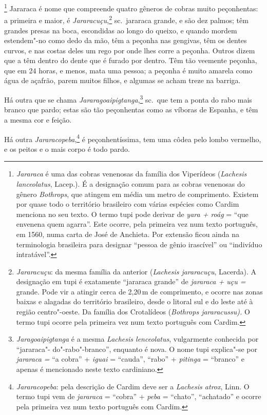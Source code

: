 \footnote{ \textit{Jararaca} é uma das cobras
venenosas da família dos Viperídeos (\textit{Lachesis lanceolatus}, 
Lacep.). É a designação comum para as cobras venenosas do gênero
\textit{Bothrops}, que atingem em média um metro de comprimento.
Existem por quase todo o território brasileiro com várias espécies como
Cardim menciona no seu texto. O termo tupi pode derivar de \textit{yara
+ roág} = ``que envenena quem agarra''. Este ocorre, pela primeira vez 
num texto português, em 1560, numa carta de José de Anchieta.
Por extensão ficou ainda na terminologia brasileira para designar
``pessoa de gênio irascível'' ou ``indivíduo intratável''.} 
Jararaca é nome que compreende quatro gêneros de cobras muito
peçonhentas: a primeira e maior, é \textit{Jararacuçu},\footnote{ \textit{Jararacuçu}: 
da mesma família da anterior (\textit{Lachesis
jararacuçu}, Lacerda). A designação em tupi é exatamente ``jararaca
grande'' de \textit{jararaca + uçu =} grande. Pode vir a atingir cerca
de 2,20\,m de comprimento, e ocorre nas zonas baixas e alagadas do
território brasileiro, desde o litoral sul e do leste até à região
centro"-oeste. Da família dos Crotalídeos (\textit{Bothrops
jararacussu).} O termo tupi ocorre pela primeira vez num texto português
com Cardim.} sc.~jararaca grande, e são dez palmos; têm grandes presas
na boca, escondidas ao longo do queixo, e quando mordem estendem"-no
como dedo da mão, têm a peçonha nas gengivas, têm os dentes curvos, e
nas costas deles um rego por onde lhes corre a peçonha. Outros dizem
que a têm dentro do dente que é furado por dentro. Têm tão veemente
peçonha, que em 24 horas, e menos, mata uma pessoa; a peçonha é muito
amarela como água de açafrão, parem muitos filhos, e algumas se acham
treze na barriga.

 Há outra que se chama \textit{Jararagoaipigtanga},\footnote{ \textit{Jaragoaipigtanga} 
é a mesma \textit{Lachesis lenceolatus}, vulgarmente conhecida por ``jararaca"- do"-rabo"-branco'', enquanto é nova.
O nome tupi explica"-se por \textit{jararaca =} ``a cobra'' + \textit{iguai} = 
``cauda'', ``rabo'' + \textit{pitinga} = ``branco'' e apenas é
mencionado neste texto cardiniano.} sc.~que tem a ponta do rabo mais
branco que pardo; estas são tão peçonhentas como as víboras de Espanha,
e têm a mesma cor e feição.

 Há outra \textit{Jararacopeba},\footnote{ \textit{Jararacopeba}: pela
descrição de Cardim deve ser a \textit{Lachesis atrox}, Linn. O termo
tupi vem de \textit{jararaca} = ``cobra'' + \textit{peba} = 
``chato'', ``achatado'' e ocorre pela primeira vez num
texto português com Cardim.} é peçonhentíssima, tem uma côdea pelo
lombo vermelho, e os peitos e o mais corpo é todo pardo.

